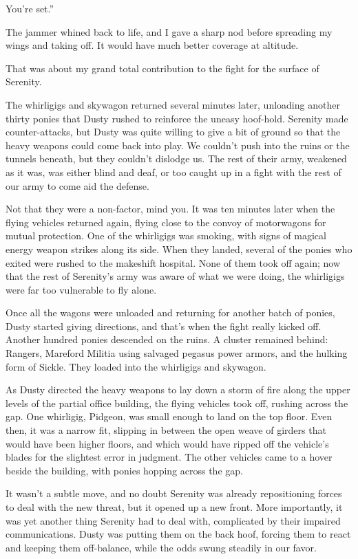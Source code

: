 \leavevmode{}You’re set.”

The jammer whined back to life, and I gave a sharp nod before spreading my wings and taking off. It would have much better coverage at altitude.

That was about my grand total contribution to the fight for the surface of Serenity.

The whirligigs and skywagon returned several minutes later, unloading another thirty ponies that Dusty rushed to reinforce the uneasy hoof-hold. Serenity made counter-attacks, but Dusty was quite willing to give a bit of ground so that the heavy weapons could come back into play. We couldn’t push into the ruins or the tunnels beneath, but they couldn’t dislodge us. The rest of their army, weakened as it was, was either blind and deaf, or too caught up in a fight with the rest of our army to come aid the defense.

Not that they were a non-factor, mind you. It was ten minutes later when the flying vehicles returned again, flying close to the convoy of motorwagons for mutual protection. One of the whirligigs was smoking, with signs of magical energy weapon strikes along its side. When they landed, several of the ponies who exited were rushed to the makeshift hospital. None of them took off again; now that the rest of Serenity’s army was aware of what we were doing, the whirligigs were far too vulnerable to fly alone.

Once all the wagons were unloaded and returning for another batch of ponies, Dusty started giving directions, and that’s when the fight really kicked off. Another hundred ponies descended on the ruins. A cluster remained behind: Rangers, Mareford Militia using salvaged pegasus power armors, and the hulking form of Sickle. They loaded into the whirligigs and skywagon.

As Dusty directed the heavy weapons to lay down a storm of fire along the upper levels of the partial office building, the flying vehicles took off, rushing across the gap. One whirligig, Pidgeon, was small enough to land on the top floor. Even then, it was a narrow fit, slipping in between the open weave of girders that would have been higher floors, and which would have ripped off the vehicle’s blades for the slightest error in judgment. The other vehicles came to a hover beside the building, with ponies hopping across the gap.

It wasn’t a subtle move, and no doubt Serenity was already repositioning forces to deal with the new threat, but it opened up a new front. More importantly, it was yet another thing Serenity had to deal with, complicated by their impaired communications. Dusty was putting them on the back hoof, forcing them to react and keeping them off-balance, while the odds swung steadily in our favor.

